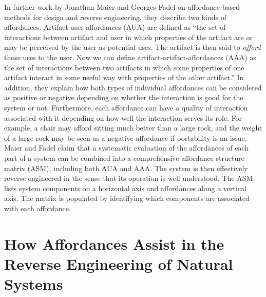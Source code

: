 In further work by Jonathan Maier and Georges Fadel on affordance-based
methods for design and reverse engineering, they describe two kinds of
affordances. Artifact-user-affordances (AUA) are defined as “the set of
interactions between artifact and user in which properties of the
artifact are or may be perceived by the user as potential uses. The
artifact is then said to \textit{afford} those uses to the user. Now we
can define artifact-artifact-affordances (AAA) as the set of
interactions between two artifacts in which some properties of one
artifact interact in some useful way with properties of the other
artifact.”\citep{maierfadel2003} In addition, they explain how both types
of individual affordances can be considered as positive or negative
depending on whether the interaction is good for the system or not.
Furthermore, each affordance can have a quality of interaction
associated with it depending on how well the interaction serves its
role. For example, a chair may afford sitting much better than a large
rock, and the weight of a large rock may be seen as a negative
affordance if portability is an issue. Maier and Fadel claim that a
systematic evaluation of the affordances of each part of a system can
be combined into a comprehensive affordance structure matrix (ASM),
including both AUA and AAA.\citep{maieretal2003}\citep{maieretal2008} The system is then
effectively reverse engineered in the sense that its operation is well
understood. The ASM lists system components on a horizontal axis and
affordances along a vertical axis. The matrix is populated by
identifying which components are associated with each affordance.

\section{How Affordances Assist in the Reverse Engineering of Natural Systems}

